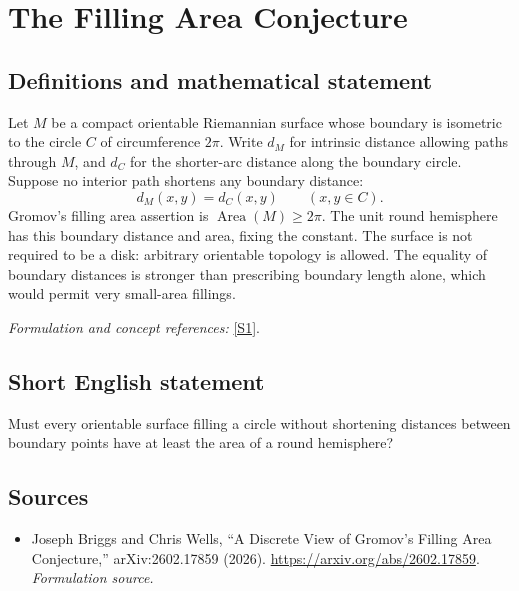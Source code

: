 \documentclass[11pt]{article}
\begin{document}
\section*{\texorpdfstring{The Filling Area Conjecture}{The Filling Area Conjecture}}\label{1209}
\subsection{Definitions and mathematical statement}
Let $M$ be a compact orientable Riemannian surface whose boundary is isometric to the circle $C$ of circumference $2\pi$. Write $d_M$ for intrinsic distance allowing paths through $M$, and $d_C$ for the shorter-arc distance along the boundary circle. Suppose no interior path shortens any boundary distance:
\[
 d_M(x,y)=d_C(x,y)\qquad(x,y\in C).
\]
Gromov's filling area assertion is $\operatorname{Area}(M)\ge2\pi$. The unit round hemisphere has this boundary distance and area, fixing the constant. The surface is not required to be a disk: arbitrary orientable topology is allowed. The equality of boundary distances is stronger than prescribing boundary length alone, which would permit very small-area fillings.
\par\smallskip\textit{Formulation and concept references:} \href{https://arxiv.org/abs/2602.17859}{[S1]}.

\subsection{Short English statement}
Must every orientable surface filling a circle without shortening distances between boundary points have at least the area of a round hemisphere?
\subsection{Sources}
\begin{itemize}
\item[S1]Joseph Briggs and Chris Wells, “A Discrete View of Gromov's Filling Area Conjecture,” arXiv:2602.17859 (2026).
\url{https://arxiv.org/abs/2602.17859}.
\textit{Formulation source.}
\end{itemize}
\end{document}
